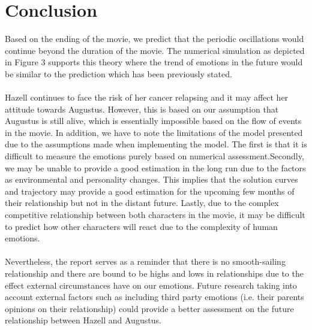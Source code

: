 \documentclass{article}
\newcommand*\circled[1]{\tikz[baseline=(char.base)]{
            \node[shape=circle,draw,inner sep=2pt] (char) {#1};}}
\begin{document}
\section*{\circled{6} Conclusion}
\newline \noindent
Based on the ending of the movie, we predict that the periodic oscillations would continue beyond the duration of the movie. The numerical simulation as depicted in Figure 3 supports this theory where the trend of emotions in the future would be similar to the prediction which has been previously stated. \\
\\
Hazell continues to face the risk of her cancer relapsing and it may affect her attitude towards Augustus. However, this is based on our assumption that Augustus is still alive, which is essentially impossible based on the flow of events in the movie. In addition, we have to note the limitations of the model presented due to the assumptions made when implementing the model. The first is that it is difficult to measure the emotions purely based on numerical assessment.Secondly, we may be unable to provide a good estimation in the long run due to the factors as environmental and personality changes. This implies that the solution curves and trajectory may provide a good estimation for the upcoming few months of their relationship but not in the distant future. Lastly, due to the complex competitive relationship between both characters in the movie, it may be difficult to predict how other characters will react due to the complexity of human emotions. \\\\
Nevertheless, the report serves as a reminder that there is no smooth-sailing relationship and there are bound to be highs and lows in relationships due to the effect external circumstances have on our emotions. Future research taking into account external factors such as including third party emotions (i.e. their parents opinions on their relationship) could provide a better assessment on the future relationship between Hazell and Augustus.\\




 
\end{document}
